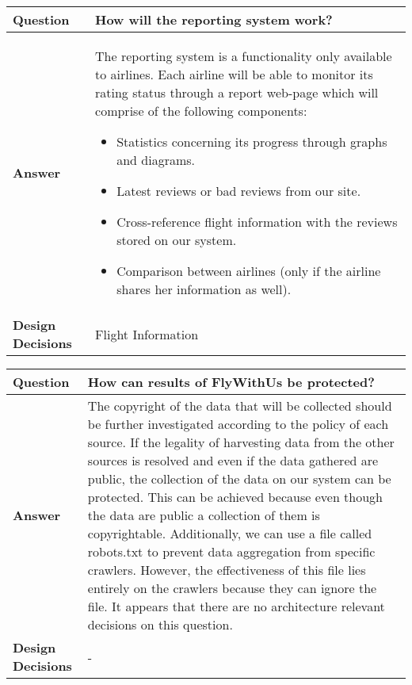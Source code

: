 \begin{longtable}{| l |  p{12cm} |}
\hline
\textbf{Question} & \textbf{How will the reporting system work?} \\ \hline
\textbf{Answer} &
	The reporting system is a functionality only available to airlines. Each airline will be able to monitor its rating status through a report web-page which will comprise of the following components:
	\begin{itemize}
	\item Statistics concerning its progress through graphs and diagrams.
	\item Latest reviews or bad reviews from our site.
	\item Cross-reference flight information with the reviews stored on our system.
	\item Comparison between airlines (only if the airline shares her information as well).
	\end{itemize}
 \\ \hline
\textbf{Design Decisions} & Flight Information \\ \hline
\end{longtable}

\newpage
\begin{longtable}{| l |  p{12cm} |}
\hline
\textbf{Question} & \textbf{How can results of FlyWithUs be protected?} \\ \hline
\textbf{Answer} &
	The copyright of the data that will be collected should be further investigated according to the policy of each source. If the legality of harvesting data from the other sources is resolved and even if the data gathered are public, the collection of the data on our system can be protected. This can be achieved because even though the data are public a collection of them is copyrightable. Additionally, we can use a file called robots.txt to prevent data aggregation from specific crawlers. However, the effectiveness of this file lies entirely on the crawlers because they can ignore the file. It appears that there are no architecture relevant decisions on this question.
 \\ \hline
\textbf{Design Decisions} & - \\ \hline
\end{longtable}

